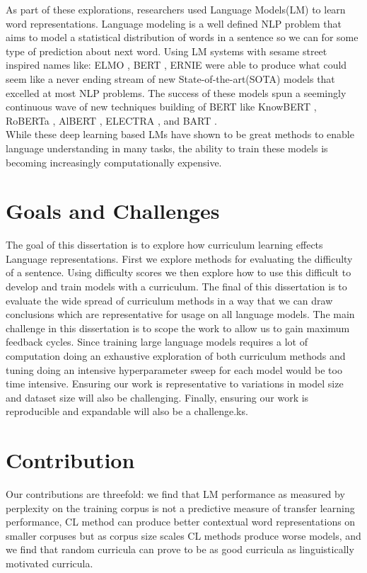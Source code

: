 As part of these explorations, researchers used Language Models(LM) to learn word representations. Language modeling is a well defined NLP problem that aims to model a statistical distribution of words in a sentence so we can for some type of prediction about next word. Using LM systems with sesame street inspired names like: ELMO \cite{Peters2019KnowledgeEC}, BERT \cite{Devlin2019BERTPO}, ERNIE \cite{Sun2019ERNIEER} were able to produce what could seem like a never ending stream of new State-of-the-art(SOTA) models that excelled at most NLP problems. The success of these models spun a seemingly continuous wave of new techniques building of BERT like KnowBERT \cite{Peters2019KnowledgeEC}, RoBERTa \cite{Liu2019RoBERTaAR}, AlBERT \cite{Lan2019ALBERTAL}, ELECTRA \cite{Clark2020ELECTRAPT}, and BART \cite{Lewis2019BARTDS}.  \\
While these deep learning based LMs have shown to be great methods to enable language understanding in many tasks, the ability to train these models is becoming increasingly computationally expensive. 
\section {Goals and Challenges}
The goal of this dissertation is to explore how curriculum learning effects Language representations. First we explore methods for evaluating the difficulty of a sentence. Using difficulty scores we then explore how to use this difficult to develop and train models with a curriculum. The final of this dissertation is to evaluate the wide spread of curriculum methods in a way that we can draw conclusions which are representative for usage on all language models.
The main challenge in this dissertation is to scope the work to allow us to gain maximum feedback cycles. Since training large language models requires a lot of computation doing an exhaustive exploration of both curriculum methods and tuning doing an intensive hyperparameter sweep for each model would be too time intensive. Ensuring our work is representative to variations in model size and dataset size will also be challenging. Finally, ensuring our work is reproducible and expandable will also be a challenge.ks. 
\section{Contribution}
Our contributions are threefold: we find that LM performance as measured by perplexity on the training corpus is not a predictive measure of transfer learning performance, CL method can produce better contextual word representations on smaller corpuses but as corpus size scales CL methods produce worse models, and we find that random curricula can prove to be as good curricula as linguistically motivated curricula.
